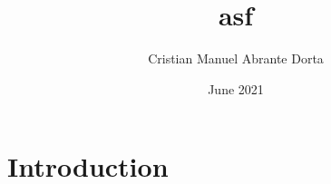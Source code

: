 \documentclass{article}
\title{asf}
\author{Cristian Manuel Abrante Dorta}
\date{June 2021}
\begin{document}
\maketitle

\section{Introduction}
\end{document}
